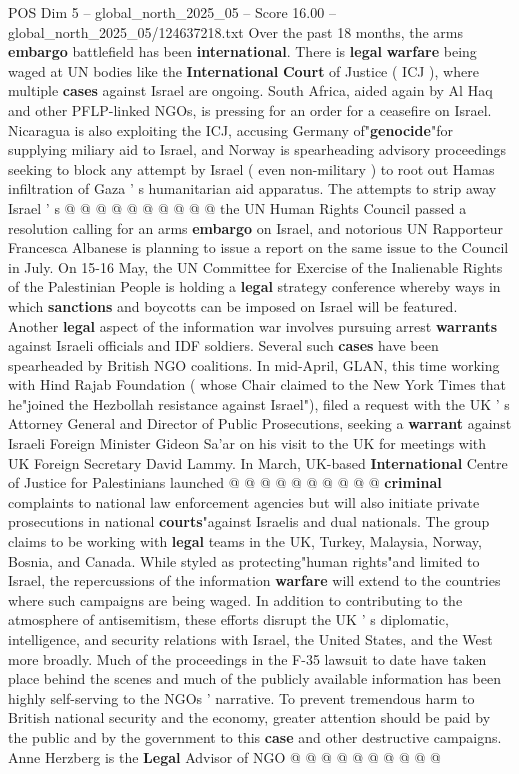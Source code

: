 \begin{textsample}{POS Dim 5 – global\_north\_2025\_05 – Score 16.00 – global\_north\_2025\_05/124637218.txt}
Over the past 18 months, the arms \textbf{embargo} battlefield has been \textbf{international}.
There is \textbf{legal} \textbf{warfare} being waged at UN bodies like the \textbf{International} \textbf{Court} of Justice ( ICJ ), where multiple \textbf{cases} against Israel are ongoing.
South Africa, aided again by Al Haq and other PFLP-linked NGOs, is pressing for an order for a ceasefire on Israel.
Nicaragua is also exploiting the ICJ, accusing Germany of"\textbf{genocide}"for supplying miliary aid to Israel, and Norway is spearheading advisory proceedings seeking to block any attempt by Israel ( even non-military ) to root out Hamas infiltration of Gaza ' s humanitarian aid apparatus.
The attempts to strip away Israel ' s @ @ @ @ @ @ @ @ @ @ the UN Human Rights Council passed a resolution calling for an arms \textbf{embargo} on Israel, and notorious UN Rapporteur Francesca Albanese is planning to issue a report on the same issue to the Council in July.
On 15-16 May, the UN Committee for Exercise of the Inalienable Rights of the Palestinian People is holding a \textbf{legal} strategy conference whereby ways in which \textbf{sanctions} and boycotts can be imposed on Israel will be featured.
Another \textbf{legal} aspect of the information war involves pursuing arrest \textbf{warrants} against Israeli officials and IDF soldiers.
Several such \textbf{cases} have been spearheaded by British NGO coalitions.
In mid-April, GLAN, this time working with Hind Rajab Foundation ( whose Chair claimed to the New York Times that he"joined the Hezbollah resistance against Israel"), filed a request with the UK ' s Attorney General and Director of Public Prosecutions, seeking a \textbf{warrant} against Israeli Foreign Minister Gideon Sa'ar on his visit to the UK for meetings with UK Foreign Secretary David Lammy.
In March, UK-based \textbf{International} Centre of Justice for Palestinians launched @ @ @ @ @ @ @ @ @ @ \textbf{criminal} complaints to national law enforcement agencies but will also initiate private prosecutions in national \textbf{courts}"against Israelis and dual nationals.
The group claims to be working with \textbf{legal} teams in the UK, Turkey, Malaysia, Norway, Bosnia, and Canada.
While styled as protecting"human rights"and limited to Israel, the repercussions of the information \textbf{warfare} will extend to the countries where such campaigns are being waged.
In addition to contributing to the atmosphere of antisemitism, these efforts disrupt the UK ' s diplomatic, intelligence, and security relations with Israel, the United States, and the West more broadly.
Much of the proceedings in the F-35 lawsuit to date have taken place behind the scenes and much of the publicly available information has been highly self-serving to the NGOs ' narrative.
To prevent tremendous harm to British national security and the economy, greater attention should be paid by the public and by the government to this \textbf{case} and other destructive campaigns.
Anne Herzberg is the \textbf{Legal} Advisor of NGO @ @ @ @ @ @ @ @ @ @

\end{textsample}
